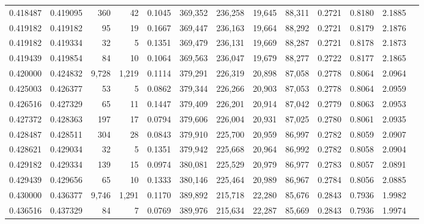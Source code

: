 \begin{tabular}{rrrrrrrrrrrrr}
0.418487 & 0.419095 &    360 &    42 &                                     0.1045 & 369,352 & 236,258 &  19,645 &  88,311 & 0.2721 & 0.8180 & 2.1885 \\
0.419182 & 0.419182 &     95 &    19 &                                     0.1667 & 369,447 & 236,163 &  19,664 &  88,292 & 0.2721 & 0.8179 & 2.1876 \\
0.419182 & 0.419334 &     32 &     5 &                                     0.1351 & 369,479 & 236,131 &  19,669 &  88,287 & 0.2721 & 0.8178 & 2.1873 \\
0.419439 & 0.419854 &     84 &    10 &                                     0.1064 & 369,563 & 236,047 &  19,679 &  88,277 & 0.2722 & 0.8177 & 2.1865 \\
0.420000 & 0.424832 &  9,728 & 1,219 &                                     0.1114 & 379,291 & 226,319 &  20,898 &  87,058 & 0.2778 & 0.8064 & 2.0964 \\
0.425003 & 0.426377 &     53 &     5 &                                     0.0862 & 379,344 & 226,266 &  20,903 &  87,053 & 0.2778 & 0.8064 & 2.0959 \\
0.426516 & 0.427329 &     65 &    11 &                                     0.1447 & 379,409 & 226,201 &  20,914 &  87,042 & 0.2779 & 0.8063 & 2.0953 \\
0.427372 & 0.428363 &    197 &    17 &                                     0.0794 & 379,606 & 226,004 &  20,931 &  87,025 & 0.2780 & 0.8061 & 2.0935 \\
0.428487 & 0.428511 &    304 &    28 &                                     0.0843 & 379,910 & 225,700 &  20,959 &  86,997 & 0.2782 & 0.8059 & 2.0907 \\
0.428621 & 0.429034 &     32 &     5 &                                     0.1351 & 379,942 & 225,668 &  20,964 &  86,992 & 0.2782 & 0.8058 & 2.0904 \\
0.429182 & 0.429334 &    139 &    15 &                                     0.0974 & 380,081 & 225,529 &  20,979 &  86,977 & 0.2783 & 0.8057 & 2.0891 \\
0.429439 & 0.429656 &     65 &    10 &                                     0.1333 & 380,146 & 225,464 &  20,989 &  86,967 & 0.2784 & 0.8056 & 2.0885 \\
0.430000 & 0.436377 &  9,746 & 1,291 &                                     0.1170 & 389,892 & 215,718 &  22,280 &  85,676 & 0.2843 & 0.7936 & 1.9982 \\
0.436516 & 0.437329 &     84 &     7 &                                     0.0769 & 389,976 & 215,634 &  22,287 &  85,669 & 0.2843 & 0.7936 & 1.9974 \\

\end{tabular}
